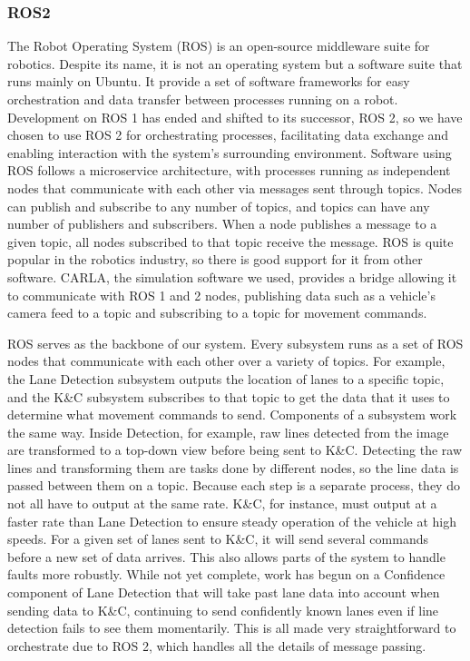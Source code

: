 \documentclass[titlepage,draft]{article}
\begin{document}
{\subsubsection{ROS2}
The Robot Operating System (ROS) is an open-source middleware suite for robotics. Despite its name, it is not an operating system but a software suite that runs mainly on Ubuntu. It provide a set of software frameworks for easy orchestration and data transfer between processes running on a robot.\cite{ros_documentation} Development on ROS 1 has ended and shifted to its successor, ROS 2, so we have chosen to use ROS 2 for orchestrating processes, facilitating data exchange and enabling interaction with the system's surrounding environment. Software using ROS follows a microservice architecture, with processes running as independent nodes that communicate with each other via messages sent through topics. Nodes can publish and subscribe to any number of topics, and topics can have any number of publishers and subscribers. When a node publishes a message to a given topic, all nodes subscribed to that topic receive the message. ROS is quite popular in the robotics industry, so there is good support for it from other software. CARLA, the simulation software we used, provides a bridge allowing it to communicate with ROS 1 and 2 nodes, publishing data such as a vehicle's camera feed to a topic and subscribing to a topic for movement commands.

ROS serves as the backbone of our system. Every subsystem runs as a set of ROS nodes that communicate with each other over a variety of topics. For example, the Lane Detection subsystem outputs the location of lanes to a specific topic, and the K\&C subsystem subscribes to that topic to get the data that it uses to determine what movement commands to send. Components of a subsystem work the same way. Inside Detection, for example, raw lines detected from the image are transformed to a top-down view before being sent to K\&C. Detecting the raw lines and transforming them are tasks done by different nodes, so the line data is passed between them on a topic. Because each step is a separate process, they do not all have to output at the same rate. K\&C, for instance, must output at a faster rate than Lane Detection to ensure steady operation of the vehicle at high speeds. For a given set of lanes sent to K\&C, it will send several commands before a new set of data arrives. This also allows parts of the system to handle faults more robustly. While not yet complete, work has begun on a Confidence component of Lane Detection that will take past lane data into account when sending data to K\&C, continuing to send confidently known lanes even if line detection fails to see them momentarily. This is all made very straightforward to orchestrate due to ROS 2, which handles all the details of message passing.

}
\end{document}
